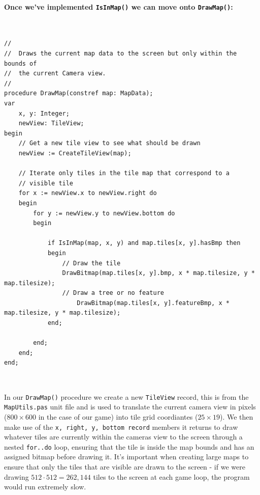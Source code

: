 \documentclass{article}
\begin{document}
\paragraph{Once we've implemented \texttt{IsInMap()} we can move onto \texttt{DrawMap()}:} 
\
\vspace{0.5cm}

\begin{mdframed}[backgroundcolor=darkgray]
\begin{verbatim}
//
//	Draws the current map data to the screen but only within the bounds of
//	the current Camera view.
//
procedure DrawMap(constref map: MapData);
var
	x, y: Integer;
	newView: TileView;
begin
	// Get a new tile view to see what should be drawn
	newView := CreateTileView(map);

	// Iterate only tiles in the tile map that correspond to a
	// visible tile 
	for x := newView.x to newView.right do
  	begin
	  	for y := newView.y to newView.bottom do
	  	begin
	  		
	  		if IsInMap(map, x, y) and map.tiles[x, y].hasBmp then
	  		begin
	  			// Draw the tile
	  			DrawBitmap(map.tiles[x, y].bmp, x * map.tilesize, y * map.tilesize);
	  			// Draw a tree or no feature
					DrawBitmap(map.tiles[x, y].featureBmp, x * map.tilesize, y * map.tilesize);
	  		end;

	  	end;
  	end;
end;
\end{verbatim}
\end{mdframed}

\

In our \texttt{DrawMap()} procedure we create a new \texttt{TileView} record, this is from the \texttt{MapUtils.pas} unit file and is used to translate the current camera view in pixels ($800 \times 600$ in the case of our game) into tile grid coordiantes ($25 \times 19$). We then make use of the \texttt{x, right, y, bottom record} members it returns to draw whatever tiles are currently within the cameras view to the screen through a nested \texttt{for..do} loop, ensuring that the tile is inside the map bounds and has an assigned bitmap before drawing it. It's important when creating large maps to ensure that only the tiles that are visible are drawn to the screen - if we were drawing $512 \cdot 512 = 262,144$ tiles to the screen at each game loop, the program would run extremely slow.
 
\end{document}
